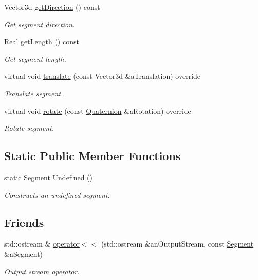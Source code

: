 \begin{DoxyCompactItemize}
Vector3d \hyperlink{classlibrary_1_1math_1_1geom_1_1d3_1_1objects_1_1_segment_afc15a855d660d67e96467466c4442bbc}{get\+Direction} () const
\begin{DoxyCompactList}\small\item\em Get segment direction. \end{DoxyCompactList}\item 
Real \hyperlink{classlibrary_1_1math_1_1geom_1_1d3_1_1objects_1_1_segment_a16b011c680e3102b8b44e6c88ffff81d}{get\+Length} () const
\begin{DoxyCompactList}\small\item\em Get segment length. \end{DoxyCompactList}\item 
virtual void \hyperlink{classlibrary_1_1math_1_1geom_1_1d3_1_1objects_1_1_segment_a9a6b09a627c59fd2f2f3bd01a5afea22}{translate} (const Vector3d \&a\+Translation) override
\begin{DoxyCompactList}\small\item\em Translate segment. \end{DoxyCompactList}\item 
virtual void \hyperlink{classlibrary_1_1math_1_1geom_1_1d3_1_1objects_1_1_segment_a9d1693e80bd013a09334b9b7233abc2f}{rotate} (const \hyperlink{classlibrary_1_1math_1_1geom_1_1trf_1_1rot_1_1_quaternion}{Quaternion} \&a\+Rotation) override
\begin{DoxyCompactList}\small\item\em Rotate segment. \end{DoxyCompactList}\end{DoxyCompactItemize}
\subsection*{Static Public Member Functions}
\begin{DoxyCompactItemize}
\item 
static \hyperlink{classlibrary_1_1math_1_1geom_1_1d3_1_1objects_1_1_segment}{Segment} \hyperlink{classlibrary_1_1math_1_1geom_1_1d3_1_1objects_1_1_segment_a3b2505e9553ba0067f8184120c106602}{Undefined} ()
\begin{DoxyCompactList}\small\item\em Constructs an undefined segment. \end{DoxyCompactList}\end{DoxyCompactItemize}
\subsection*{Friends}
\begin{DoxyCompactItemize}
\item 
std\+::ostream \& \hyperlink{classlibrary_1_1math_1_1geom_1_1d3_1_1objects_1_1_segment_a769c800b35f5bfd6979e7372e402ef1b}{operator$<$$<$} (std\+::ostream \&an\+Output\+Stream, const \hyperlink{classlibrary_1_1math_1_1geom_1_1d3_1_1objects_1_1_segment}{Segment} \&a\+Segment)
\begin{DoxyCompactList}\small\item\em Output stream operator. \end{DoxyCompactList}\end{DoxyCompactItemize}


